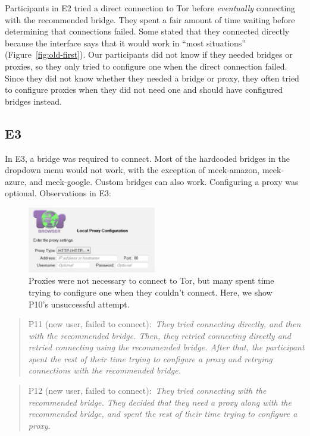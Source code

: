 \documentclass[USenglish,oneside,twocolumn]{article}
\newcommand{\pquote}[2]{
\begin{quotation}
\noindent #1:~\textit{#2}
\end{quotation}
}
\begin{document}
Participants in E2 tried a direct connection to Tor before \emph{eventually} connecting with the recommended bridge.
They spent a fair amount of time waiting before determining that connections failed. Some stated that they connected directly because the interface says that it would work in ``most situations'' (Figure~\ref{fig:old-first}). Our participants did not know if they needed bridges or proxies, so they only tried to configure one when the direct connection failed. Since they did not know whether they needed a bridge or proxy, they often tried to configure proxies when they did not need one and should have configured bridges instead.  

\subsection{E3}
In E3, a bridge was required to connect. Most of the hardcoded bridges in the dropdown menu would not work, with the exception of meek-amazon, meek-azure, and meek-google. Custom bridges can also work. Configuring a proxy was optional.
Observations in E3: 

\begin{figure}[t]
\centering
\includegraphics[width=0.5\textwidth]{P8-proxy-attempt.png}
\caption{
Proxies were not necessary to connect to Tor, but many spent time trying to configure one when they couldn't connect. Here, we show P10's unsuccessful attempt. 
}
\label{fig:proxy-attempt}
\end{figure}

\pquote{P11 (new user, failed to connect)}{They tried connecting directly, and then with the recommended bridge. Then, they retried connecting directly and retried connecting using the recommended bridge. After that, the participant spent the rest of their time trying to configure a proxy and retrying connections with the recommended bridge.}

\pquote{P12 (new user, failed to connect)}{They tried connecting with the recommended bridge. They decided that they need a proxy along with the recommended bridge, and spent the rest of their time trying to configure a proxy.}
\end{document}
